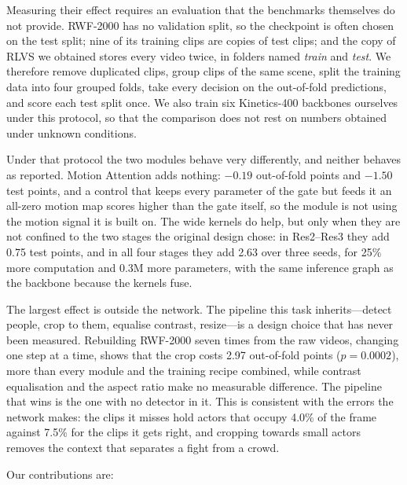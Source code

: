 \documentclass[conference]{IEEEtran}
\begin{document}
Measuring their effect requires an evaluation that the benchmarks
themselves do not provide. RWF-2000 has no validation split, so the
checkpoint is often chosen on the test split; nine of its training clips
are copies of test clips; and the copy of RLVS we obtained stores every
video twice, in folders named \emph{train} and \emph{test}. We therefore
remove duplicated clips, group clips of the same scene, split the training
data into four grouped folds, take every decision on the out-of-fold
predictions, and score each test split once. We also train six
Kinetics-400 backbones ourselves under this protocol, so that the
comparison does not rest on numbers obtained under unknown conditions.

Under that protocol the two modules behave very differently, and neither
behaves as reported. Motion Attention adds nothing: $-0.19$ out-of-fold
points and $-1.50$ test points, and a control that keeps every parameter
of the gate but feeds it an all-zero motion map scores higher than the
gate itself, so the module is not using the motion signal it is built on.
The wide kernels do help, but only when they are not confined to the two
stages the original design chose: in Res2--Res3 they add 0.75 test points,
and in all four stages they add 2.63 over three seeds, for 25\% more
computation and 0.3M more parameters, with the same inference graph as the
backbone because the kernels fuse.

The largest effect is outside the network. The pipeline this task
inherits---detect people, crop to them, equalise contrast, resize---is a
design choice that has never been measured. Rebuilding RWF-2000 seven
times from the raw videos, changing one step at a time, shows that the
crop costs 2.97 out-of-fold points ($p=0.0002$), more than every module and
the training recipe combined, while contrast equalisation and the aspect
ratio make no measurable difference. The pipeline that wins is the one
with no detector in it. This is consistent with the errors the network
makes: the clips it misses hold actors that occupy 4.0\% of the frame
against 7.5\% for the clips it gets right, and cropping towards small
actors removes the context that separates a fight from a crowd.

Our contributions are:
\end{document}
